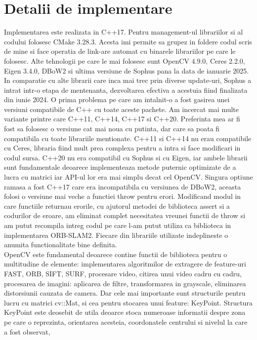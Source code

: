 \documentclass[12pt,a4paper]{report}
\begin{document}
\chapter{Detalii de implementare}
Implementarea este realizata in C++17. Pentru management-ul librariilor si al codului folosesc
CMake 3.28.3. Acesta imi permite sa grupez in foldere codul scris de mine si face operatia de 
link-are automat cu binarele librariilor pe care le folosesc. Alte tehnologii pe care le 
mai folosesc sunt OpenCV 4.9.0, Ceres 2.2.0, Eigen 3.4.0, DBoW2 si ultima versiune de Sophus
pana la data de ianuarie 2025. In comparatie cu alte librarii care inca mai trec 
prin diverse update-uri, Sophus a intrat intr-o etapa de mentenanta, dezvoltarea efectiva a 
acestuia fiind finalizata din iunie 2024. O prima problema pe care am intalnit-o a fost gasirea 
unei versiuni compatibile de C++ cu toate aceste pachete. Am incercat mai multe variante printre 
care C++11, C++14, C++17 si C++20. Preferinta mea ar fi fost sa folosesc o versiune cat mai noua
cu putinta, dar care sa poata fi compatibila cu toate librariile mentionate. C++11 si C++14 nu 
erau compatibile cu Ceres, libraria fiind mult prea complexa pentru a intra si face modificari in
codul sursa. C++20 nu era compatibil cu Sophus si cu Eigen, iar ambele librarii sunt fundamentale 
deoarece implementeaza metode puternic optimizate de a lucra cu matrici iar API-ul lor era mai 
simplu decat cel OpenCV. Singura optiune ramasa a fost C++17 care era incompatibila cu versiunea 
de DBoW2, aceasta folosi o versiune mai veche a functiei throw pentru erori. Modificand 
modul in care functiile returnau erorile, cu ajutorul metodei de biblioteca assert si a 
codurilor de eroare, am eliminat complet necesitatea vreunei functii de throw si am putut 
recompila intreg codul pe care l-am putut utiliza ca biblioteca in implementarea ORB-SLAM2.
Fiecare din librariile utilizate indeplineste o anumita functionalitate bine definita. \\
OpenCV este fundamental deoarece contine functii de biblioteca pentru o multitudine 
de elemente: implementarea algoritmilor de extragere de feature-uri FAST, ORB, SIFT, SURF,
procesare video, citirea unui video cadru cu cadru, procesarea de imagini: aplicarea de filtre,
transformarea in grayscale, eliminarea distorsiunii cauzata de camera. Dar cele mai importante 
sunt structurile pentru lucru cu matrici cv::Mat, si cea pentru stocarea unui feature: KeyPoint.
Structura KeyPoint este deosebit de utila deoarce stoca numeroase informatii despre zona pe 
care o reprezinta, orientarea acesteia, coordonatele centrului si nivelul la care a fost observat, 
\end{document}
